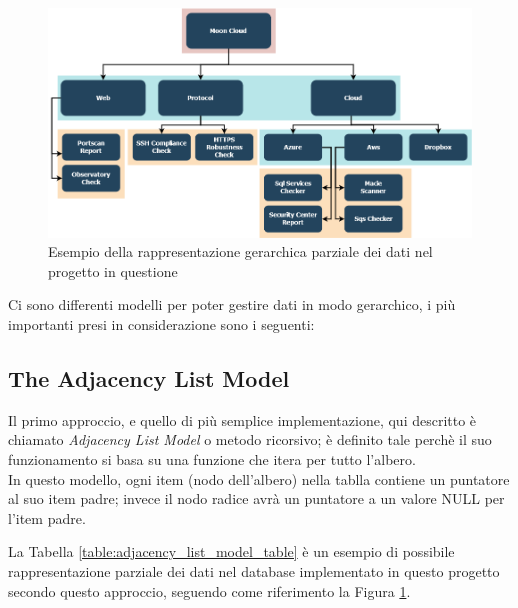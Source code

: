 \begin{figure}[ht!]
	\centering
	\includegraphics[scale=0.49]{images/MC_Rec_Tree.png}
	\caption{Esempio della rappresentazione gerarchica parziale dei dati nel progetto in questione}
	\label{fig:MC_Rec_Tree}
\end{figure}


Ci sono differenti modelli per poter gestire dati in modo gerarchico, i più importanti  presi in considerazione sono i seguenti:

\subsection{The Adjacency List Model}
Il primo approccio, e quello di più semplice implementazione, qui descritto è chiamato \textit{Adjacency List Model} o metodo ricorsivo;
è definito tale perchè il suo funzionamento si basa su una funzione che itera per tutto l'albero.\\
In questo modello, ogni item (nodo dell'albero) nella tablla contiene un puntatore al suo item padre; invece il nodo radice avrà un 
puntatore a un valore NULL per l'item padre.

La Tabella \ref{table:adjacency_list_model_table} è un esempio di possibile rappresentazione parziale dei dati nel database implementato 
in questo progetto secondo questo approccio, seguendo come riferimento la Figura \ref{fig:MC_Rec_Tree}.
 
